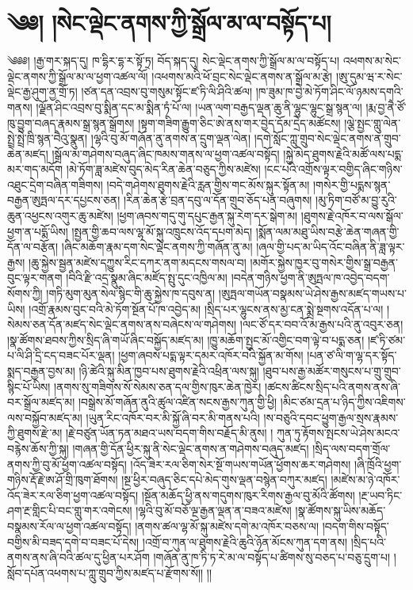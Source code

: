 \chapter{༄༅། །སེང་ལྡེང་ནགས་ཀྱི་སྒྲོལ་མ་ལ་བསྟོད་པ།}༄༅༅། །རྒྱ་གར་སྐད་དུ། ཁ་དྷིར་དྷ་ར་སྟོ་ཏྲ། བོད་སྐད་དུ། སེང་ལྡེང་ནགས་ཀྱི་སྒྲོལ་མ་ལ་བསྟོད་པ། འཕགས་མ་སེང་ལྡེང་ནགས་ཀྱི་སྒྲོལ་མ་ལ་ཕྱག་འཚལ་ལོ། །འཕགས་མའི་ཕོ་བྲང་སེང་ལྡེང་ནགས་ན་སྒྲོལ་མ་རྩེ། །ཨུ་དུམ་ཝ་ར་སེང་ལྡེང་རྒྱ་ཤུག་ནྱ་གྲོ་ཏ། །ཙན་དན་འབྲས་བུ་གསུམ་སྟོང་ཛ་ཏི་ལི་ཤིའི་ཚལ། །ཁ་ཟུམ་ཁ་བྱེ་མེ་ཏོག་ཤིང་ལོ་ཉམས་དགའི་གནས། །ལྗོན་ཤིང་འབྲས་བུ་སྨིན་དང་མ་སྨིན་ཏཾ་པོ་ལ། །ཡན་ལག་བརྒྱད་ལྡན་ཆུ་ནི་ལྷུང་ལྷུང་སྒྲ་སྙན་ལ། །རྨ་བྱ་ནཻ་ཙོ་ཁུ་བྱུག་བཞད་རྣམས་སྒྲ་སྙན་སྒྲོགས། །སྟག་གཟིག་རྒྱུག་ཅིང་ཨེ་ནས་གར་བྱེད་དོམ་དྲེད་མཚོངས། །ལྕེ་སྤྱང་གླུ་ལེན་སྤྲེ་སྤྲེ་ཁྲི་སྙན་བཻའུ་སྣུན། །ལྷའི་བུ་མོ་གཞོན་ནུ་ནགས་ན་དྲུག་ལྡན་ལེན། །དགེ་སློང་ཀླུ་གྲུབ་སེང་ལྡེང་ནགས་ན་གྲུབ་ཆེན་མཛད། །སྒྲོལ་མ་གཤེགས་བཞུད་ཞིང་ཁམས་གནས་ལ་ཕྱག་འཚལ་བསྟོད། །སྐྱེ་མེད་ཐུགས་རྗེའི་མཚོ་ལས་པདྨ་མར་གད་མདོག །མེ་ཏོག་ཟླ་མཛེས་བུད་མེད་རིན་ཆེན་བཅུད་ཀྱིས་མཛེས། །ངང་པའི་འགྲོས་ལྟར་བགྱིད་ཞིང་གཉིས་འཐུང་དྲེག་བཞིན་གཟིགས། །བདེ་གཤེགས་ཐུགས་རྗེའི་རླན་གྱིས་གང་མོས་སྐུར་སྟོན་མ། །གསེར་གྱི་པདྨས་སྙན་བརྒྱན་ཨུཏྤལ་དར་དཔྱངས་ཅན། །རིན་ཆེན་རྩེ་བྲན་དབུ་ལ་དོན་གྲུབ་ཅོད་པན་བཞུགས། །མུ་ཏིག་བཙོ་མ་བྱུ་རུའི་ཆུན་འཕྱངས་འགུར་ཆུ་མཛེས། །ཕྱག་ཞབས་གདུ་གུ་དཔུང་རྒྱན་སྐུ་རེག་དར་སྒེག་མ། །ཐུགས་རྗེ་འཁོར་བ་ལས་སྒོལ་ཕྱག་ན་པདྨོ་ཡིས། །སྤྱན་གྱི་ཆབ་ལས་ལྷ་མོ་སྐུ་འཁྲུངས་འོད་དཔག་མེད། །སྨོན་ལམ་མཐུ་ཡིས་བརྩེ་ཆེན་གཞན་གྱི་དོན་ལ་བརྩོན། །ཞིང་མཆོག་རྣམ་དག་སེང་ལྡེང་ནགས་ཀྱི་གཞོན་ནུ་མ། །ཞལ་གྱི་པད་མ་ཡིད་འོང་བཞིན་ནི་ཟླ་ལྟར་རྒྱས། །ཆུ་སྐྱེས་སྦྱན་མཛེས་དཀྱུས་རིང་དཀར་ནག་མདངས་གསལ་བ། །མགོར་སྐྱེས་ཁྱར་བུ་གསེར་གྱིས་སྒྲ་བརྒྱན་བུང་ལྟར་གནག །བིའི་རྫི་འདྲ་སྣུམ་ཞིང་མཛོད་སྤུ་དུང་འཁྱིལ་མ། །བདེན་གཉིས་ཕྱག་ནི་ཨུཏྤལ་ཁ་འབྱེད་བདག་སོགས་ཀྱི། །གཏི་མུག་མུན་སེལ་སྙིང་གི་ཆུ་སྐྱེས་ཁ་དབུས་ན། །ཨུཏྤལ་གཡོན་བསྣམས་ཡེ་ཤེས་རྒྱས་མཛད་གཡས་པ་ཡིས། །འགྲོ་རྣམས་བུང་བའི་མེ་ཏོག་སྔོན་པོ་ཁ་འབྱེད་མ། །སྲིད་པར་ལྷུངས་ནས་མྱ་ངན་སྨྲེ་སྔགས་འདོན་པ་ལ། །སེམས་ཅན་དོན་མཛད་སེང་ལྡེང་ནགས་ནས་བཞེངས་ལ་གཤེགས། །ལང་ཙོ་དར་བབ་འོ་མ་རྒྱས་པའི་ནུ་འབུར་ཅན། །སྣ་ཚོགས་ཐབས་ཀྱིས་སྲིད་ཞི་གཡོ་ཞིང་བསྐྱོད་མཛད་མ། །ཁྱུ་མཆོག་སྤྱང་མོ་འགྱིང་བག་ལྟེ་བ་པདྨ་ཅན། །ཛ་ཏི་ཙམ་པ་ལི་ཤི་དྲི་ངད་བཟང་པོར་ལྡན། །ཕྱག་ཞབས་པདྨ་ལྟར་དམར་འཁོར་བའི་སྐྱོན་མ་གོས། །པན་ཙ་ལི་ག་ལྷ་དར་སྟོད་སྨད་བརྒྱན་བྱས་མ། །ཉི་ཚེའི་སྐུ་མིན་ཁྱབ་པས་ཐུགས་རྗེའི་འཕྲིན་ལས་སྐུ། །ཐུབ་པས་རྒྱ་མཚོར་གསུངས་པ་གྲུ་གྲུབ་སྙིང་པོ་ཡིས། །ནགས་སུ་གཟིགས་སོ་སེམས་ཅན་དལ་གྱིས་ཁུར་ཆེན་ཁྱེར། །ཚངས་ཚིངས་སྲིད་པའི་ནགས་ནས་ཞི་བར་སྒྲོལ་མཛད་མ། །བསྒྲེས་མོ་གཞོན་ནུའི་ཚུལ་འཛིན་སངས་རྒྱས་ཀུན་གྱི་ཕྱི། །མིང་ཙམ་དྲན་པ་ཉིད་ཀྱིས་འཇིགས་ལས་བསྐྱོབ་མཛད་མ། །ཡུན་རིང་འཁོར་བར་མི་སྐྱོ་ཞི་བར་མི་གནས་པའི། །ས་བཅུའི་དབང་ཕྱུག་རྒྱལ་སྲས་རྣམས་ཀྱི་ཐུགས་རྫེ་མ། །རྗེ་བཙུན་ཡོན་ཏན་མཐའ་ཡས་བདག་གིས་བརྗོད་མི་ནུས། །
ཀུན་ཏུ་རྟོགས་སྤངས་ཡེ་ཤེས་མངའ་བརྙེས་ཆོས་ཀྱི་སྐུ། །གཞན་གྱི་དོན་ཕྱིར་སྐུ་ནི་སེང་ལྡེང་ནགས་ན་གཤེགས་བཞུད་མཛད། །སྲིད་ལས་བདག་གྲོལ་ནགས་ཀྱི་བུ་མོ་ཕྱག་འཚལ་བསྟོད། །འོད་ཟེར་རལ་ཅིག་སེར་སྔོ་གཡས་གཡོན་ཕྱོགས་ཆར་གཤེགས། །ཞི་ཁྲོའི་ཕྱག་གཉིས་རྡོ་རྗེ་ཨ་ཤོ་གྲི་ཁུག་ཐོགས། །སྔ་ཕྱིར་བཞུད་ཅིང་དཔེ་མེད་གུས་ལྡན་བསྙེན་བཀུར་མཛད། །མཛེས་མ་ཉེ་འཁོར་འོད་ཟེར་རལ་ཅིག་ཕྱག་འཚལ་བསྟོད། །སྔོན་མཆོད་ཕྱི་ནས་གདུགས་ཁུར་རིགས་རྒྱལ་བུ་མོའི་ཚོགས། །རྔ་ཡབ་ཏིང་ཤག་རྔ་གླིང་པི་བང་གླུ་གར་འགེངས། །ལྷའི་བུ་མོ་བཅོ་ལྔ་རྒྱན་ལྡན་ན་བཟའ་མཛེས། །སྣ་ཚོགས་སྐུ་ཡིས་མཆོད་བསྣམས་རོལ་ལ་ཕྱག་འཚལ་བསྟོད། །ནགས་ཚལ་ལྷ་མོ་སྐུ་མཛེས་དགེ་མ་འཁོར་བཅས་ལ། །བདག་གིས་བསྟོད་བགྱིས་མི་བཟད་དགེ་བ་བཟང་པོ་དེས། །འགྲོ་བ་ཀུན་ལ་ཐུགས་རྗེའི་ཆུའི་ཉོན་མོངས་ཀུན་དག་ནས། །སྲིད་པའི་ནགས་ནས་ཞི་བའི་ཚལ་དུ་ཕྱིན་པར་ཤོག །གཞོན་ནུ་ཁ་ཏི་ཏ་རེ་མ་ལ་བསྟོད་པ་ཚིགས་སུ་བཅད་པ་བཅུ་དྲུག་པ། །སློབ་དཔོན་འཕགས་པ་ཀླུ་གྲུབ་ཀྱིས་མཛད་པ་རྫོགས་སོ།། །།